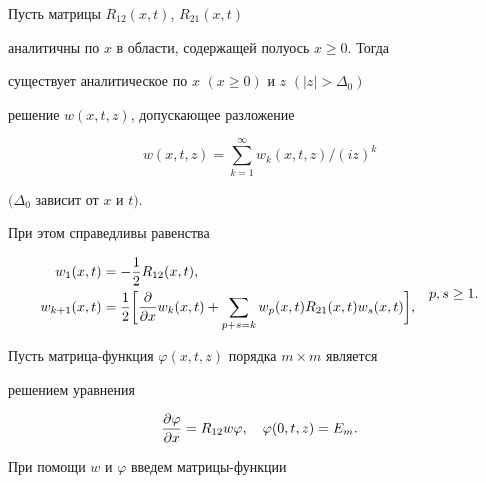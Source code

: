 \begin{thms} Пусть матрицы $R_{12}(x,t)$, $R_{21}(x,t)$ 


аналитичны по $x$ в области, содержащей полуось $x\ge 0$. Тогда 


существует аналитическое по $x$ $(x\ge 0)$ и $z$ $(|z|>\Delta_0)$ 


решение $w(x,t,z)$, допускающее разложение 


\begin{equation} 


w(x,t,z)=\sum^\infty_{k=1}w_k(x,t,z)/(i z)^k 


\end{equation} 


$(\Delta_0$ зависит от $x$ и $t)$. 


\end{thms} 


 


При этом справедливы равенства 


\begin{equation} 




\begin{split} 


w_1(x,t)&=-\frac{1}{2}R_{12}(x,t),\\ 


w_{k+1}(x,t)&=\frac{1}{2}\bigg[\myfrac{}{x}w_k(x,t)+ 


\sum_{p+s=k}w_p(x,t)R_{21}(x,t)w_s(x,t)\bigg], 


\end{split} 


\quad p,s\ge 1.




\end{equation} 


 


Пусть матрица-функция $\varphi(x,t,z)$ порядка $m\times m$ является 


решением уравнения 


\begin{equation} 


\myfrac{\varphi}{x}=R_{12}w\varphi,\quad 


\varphi(0,t,z)=E_m. 


\end{equation} 


При помощи $w$ и $\varphi$ введем матрицы-функции 


